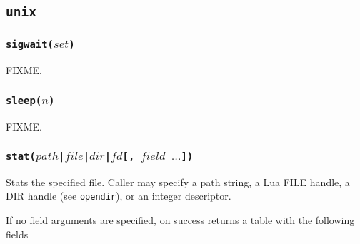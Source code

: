\documentclass[11pt, oneside]{memoir}
\newcommand*{\fn}[1]{\texttt{#1}\xspace}
\newcounter{toccols}
\newenvironment{Module}[1]{
	\subsection{\texttt{#1}}
	\addtocontents{toc}{
		\protect\begin{multicols}{\value{toccols}}
	}
}{
	\addtocontents{toc}{\protect\end{multicols}}
}
\begin{document}
\begin{Module}{unix}
\subsubsection[\fn{sigwait}]{\fn{sigwait($set$)}}

FIXME.

\subsubsection[\fn{sleep}]{\fn{sleep($n$)}}

FIXME.

\subsubsection[\fn{stat}]{\fn{stat($path$|$file$|$dir$|$fd$[, $field$ $\ldots$])}}

Stats the specified file. Caller may specify a path string, a Lua FILE handle, a DIR handle (see \fn{opendir}), or an integer descriptor.

If no field arguments are specified, on success returns a table with the following fields


\end{Module}
\end{document}
